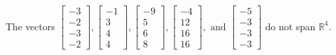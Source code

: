 \begin{exercise}
\begin{exerciseStatement}
  \end{exerciseStatement}
  \begin{exerciseAnswer}
   The vectors \(\left[\begin{array}{r}
-3 \\
-2 \\
-3 \\
-2
\end{array}\right] , \left[\begin{array}{r}
-1 \\
3 \\
4 \\
4
\end{array}\right] , \left[\begin{array}{r}
-9 \\
5 \\
6 \\
8
\end{array}\right] , \left[\begin{array}{r}
-4 \\
12 \\
16 \\
16
\end{array}\right] , \text{ and } \left[\begin{array}{r}
-5 \\
-3 \\
-3 \\
-3
\end{array}\right]\) 
  	 do not  
	span \(\mathbb{R}^4\).
  


  \end{exerciseAnswer}
\end{exercise}